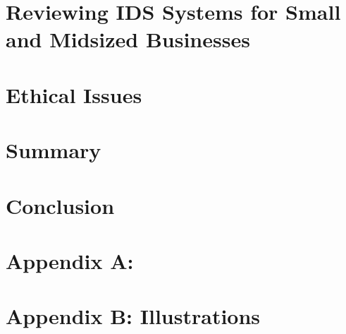 \documentclass[conference]{IEEEtran}
\begin{document}
\section{Reviewing IDS Systems for Small and Midsized Businesses}


\section{Ethical Issues}


\section{Summary}


\section{Conclusion}


\section*{Appendix A:}





\newcommand{\noroffcount}[1]{%
\immediate\write18{texcount -v0 -q -total  -sum -merge -q #1.tex > #1-words.noroff }%
}
%
%

\newcommand{\NUCwordcount}[1]{
    \section*{Word count metrics}
    \framebox{%
    \begin{minipage}{0.95\textwidth}
    \textbf{NUC Studio2 Word Count}:\\
    \noroffcount{#1}
    NOTE: References are excluded.
    \end{minipage}}
}

\newpage

\section*{Appendix B: Illustrations}


\newpage
\end{document}
